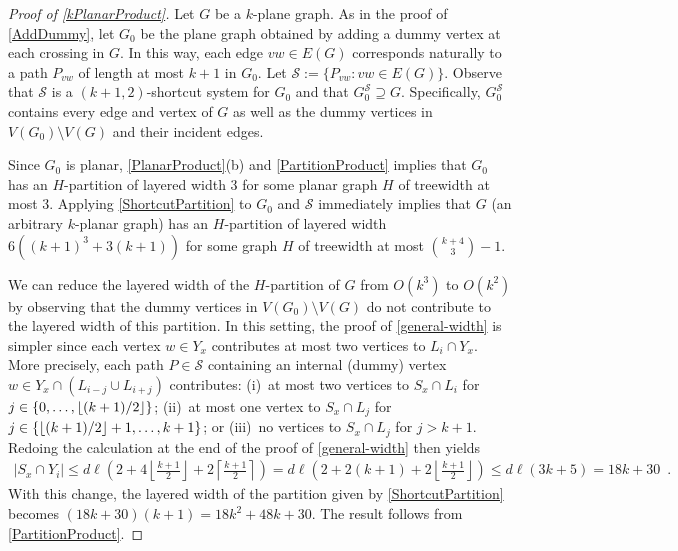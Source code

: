 \documentclass{patmorin}
\DeclareMathOperator{\tw}{tw}
\DeclarePairedDelimiter{\floor}{\lfloor}{\rfloor}
\renewcommand{\SS}{\mathcal{S}}
\renewcommand{\le}{\leqslant}
\renewcommand{\leq}{\leqslant}
\begin{document}

\begin{proof}[Proof of \cref{kPlanarProduct}]
	Let $G$ be a $k$-plane graph.
	As in the proof of \cref{AddDummy}, let $G_0$ be the plane graph obtained by adding a dummy vertex at each crossing in $G$. In this way, each edge $vw\in E(G)$ corresponds naturally to a path $P_{vw}$ of length at most $k+1$ in $G_0$.  Let $\SS := \{P_{vw}: vw\in E(G)\}$. Observe that $\SS$ is a $(k+1,2)$-shortcut system for $G_0$ and that $G_0^{\SS}\supseteq G$.  Specifically, $G_0^{\SS}$ contains every edge and vertex of $G$ as well as the dummy vertices in $V(G_0)\setminus V(G)$ and their incident edges.

	Since $G_0$ is planar,  \cref{PlanarProduct}(b) and \cref{PartitionProduct} implies that $G_0$ has an $H$-partition of layered width 3 for some planar graph $H$ of treewidth at most 3.  Applying \cref{ShortcutPartition} to $G_0$ and $\SS$ immediately implies that $G$ (an arbitrary $k$-planar graph) has an $H$-partition of layered width $6((k+1)^3+3(k+1))$ for some graph $H$ of treewidth at most $\binom{k+4}{3}-1$.

	We can reduce the layered width of the $H$-partition of $G$ from $O(k^3)$ to $O(k^2)$ by observing that the dummy vertices in $V(G_0)\setminus V(G)$ do not contribute to the layered width of this partition.  In this setting, the proof of \cref{general-width} is simpler since each vertex $w\in Y_x$ contributes at most two vertices to $L_i\cap Y_x$.  More precisely, each path $P\in\SS$ containing an internal (dummy) vertex $w\in Y_x\cap (L_{i-j}\cup L_{i+j})$ contributes: (i)~at most two vertices to $S_x\cap L_i$ for $j\in\{0,\ldots,\floor{(k+1)/2}\}$; (ii)~at most one vertex to $S_x\cap L_j$ for $j\in\{\floor{(k+1)/2}+1,\ldots,k+1\}$; or (iii)~no vertices to $S_x\cap L_j$ for $j > k+1$.
	Redoing the calculation at the end of the proof of \cref{general-width} then yields
	\begin{align*}
	|S_x\cap Y_i| \le d\ell\left(
	2
	+ 4\left\lfloor\tfrac{k+1}{2}\right\rfloor
	+ 2\left\lceil\tfrac{k+1}{2}\right\rceil
	\right)
	 =
	d\ell\left(
	2 + 2(k+1) + 2\left\lfloor\tfrac{k+1}{2}\right\rfloor
	\right)
	 \le
	d\ell(3k+5)
	= 18k+30 \enspace .
	\end{align*}
	With this change, the layered width of the partition given by \cref{ShortcutPartition} becomes $(18k+30)(k+1)=18k^2+48k+30$.
	The result follows from \cref{PartitionProduct}.
\end{proof}
\end{document}
